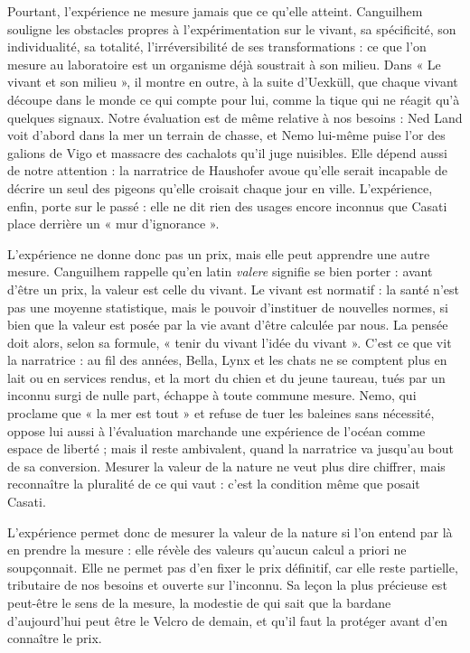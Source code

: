 \documentclass[11pt,a4paper]{article}
\begin{document}
Pourtant, l'expérience ne mesure jamais que ce qu'elle atteint. Canguilhem souligne les obstacles propres à l'expérimentation sur le vivant, sa spécificité, son individualité, sa totalité, l'irréversibilité de ses transformations : ce que l'on mesure au laboratoire est un organisme déjà soustrait à son milieu. Dans « Le vivant et son milieu », il montre en outre, à la suite d'Uexküll, que chaque vivant découpe dans le monde ce qui compte pour lui, comme la tique qui ne réagit qu'à quelques signaux. Notre évaluation est de même relative à nos besoins : Ned Land voit d'abord dans la mer un terrain de chasse, et Nemo lui-même puise l'or des galions de Vigo et massacre des cachalots qu'il juge nuisibles. Elle dépend aussi de notre attention : la narratrice de Haushofer avoue qu'elle serait incapable de décrire un seul des pigeons qu'elle croisait chaque jour en ville. L'expérience, enfin, porte sur le passé : elle ne dit rien des usages encore inconnus que Casati place derrière un « mur d'ignorance ».

L'expérience ne donne donc pas un prix, mais elle peut apprendre une autre mesure. Canguilhem rappelle qu'en latin \emph{valere} signifie se bien porter : avant d'être un prix, la valeur est celle du vivant. Le vivant est normatif : la santé n'est pas une moyenne statistique, mais le pouvoir d'instituer de nouvelles normes, si bien que la valeur est posée par la vie avant d'être calculée par nous. La pensée doit alors, selon sa formule, « tenir du vivant l'idée du vivant ». C'est ce que vit la narratrice : au fil des années, Bella, Lynx et les chats ne se comptent plus en lait ou en services rendus, et la mort du chien et du jeune taureau, tués par un inconnu surgi de nulle part, échappe à toute commune mesure. Nemo, qui proclame que « la mer est tout » et refuse de tuer les baleines sans nécessité, oppose lui aussi à l'évaluation marchande une expérience de l'océan comme espace de liberté ; mais il reste ambivalent, quand la narratrice va jusqu'au bout de sa conversion. Mesurer la valeur de la nature ne veut plus dire chiffrer, mais reconnaître la pluralité de ce qui vaut : c'est la condition même que posait Casati.

L'expérience permet donc de mesurer la valeur de la nature si l'on entend par là en prendre la mesure : elle révèle des valeurs qu'aucun calcul a priori ne soupçonnait. Elle ne permet pas d'en fixer le prix définitif, car elle reste partielle, tributaire de nos besoins et ouverte sur l'inconnu. Sa leçon la plus précieuse est peut-être le sens de la mesure, la modestie de qui sait que la bardane d'aujourd'hui peut être le Velcro de demain, et qu'il faut la protéger avant d'en connaître le prix.
\end{document}
